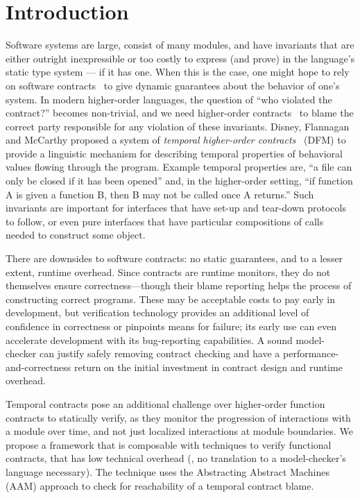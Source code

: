 
\section{Introduction}\label{sec:intro}

Software systems are large, consist of many modules, and have invariants that are either outright inexpressible or too costly to express (and prove) in the language's static type system --- if it has one.
%
When this is the case, one might hope to rely on software contracts~\cite{dvanhorn:meyer-eiffel} to give dynamic guarantees about the behavior of one's system.
%
In modern higher-order languages, the question of ``who violated the contract?'' becomes non-trivial, and we need higher-order contracts~\citep{dvanhorn:Findler2002Contracts} to blame the correct party responsible for any violation of these invariants.
%
Disney, Flannagan and McCarthy proposed a system of \emph{temporal higher-order contracts}~\citep{ianjohnson:DBLP:conf/icfp/DisneyFM11} (DFM) to provide a linguistic mechanism for describing temporal properties of behavioral values flowing through the program.
%
%
Example temporal properties are, ``a file can only be closed if it has been opened'' and, in the higher-order setting, ``if function A is given a function B, then B may not be called once A returns.''
%
Such invariants are important for interfaces that have set-up and tear-down protocols to follow, or even pure interfaces that have particular compositions of calls needed to construct some object.

There are downsides to software contracts: no static guarantees, and to a lesser extent, runtime overhead.
%
Since contracts are runtime monitors, they do not themselves ensure correctness---though their blame reporting helps the process of constructing correct programs.
%
These may be acceptable costs to pay early in development, but verification technology provides an additional level of confidence in correctness or pinpoints means for failure; its early use can even accelerate development with its bug-reporting capabilities.
%
A sound model-checker can justify safely removing contract checking and have a performance-and-correctness return on the initial investment in contract design and runtime overhead.

Temporal contracts pose an additional challenge over higher-order function contracts to statically verify, as they monitor the progression of interactions with a module over time, and not just localized interactions at module boundaries.
%
We propose a framework that is composable with techniques to verify functional contracts, that has low technical overhead (\eg, no translation to a model-checker's language necessary).
%
The technique uses the Abstracting Abstract Machines (AAM) approach \citep{dvanhorn:VanHorn2010Abstracting} to check for reachability of a temporal contract blame.

